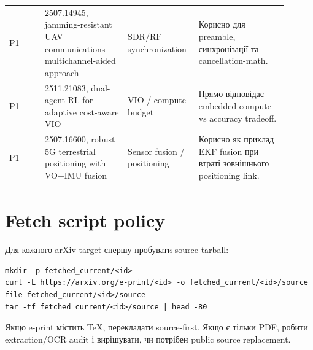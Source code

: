\begin{longtable}{L{0.12\linewidth}L{0.28\linewidth}L{0.20\linewidth}L{0.30\linewidth}}
P1 & 2507.14945, jamming-resistant UAV communications multichannel-aided approach & SDR/RF synchronization & Корисно для preamble, синхронізації та cancellation-math. \\
P1 & 2511.21083, dual-agent RL for adaptive cost-aware VIO & VIO / compute budget & Прямо відповідає embedded compute vs accuracy tradeoff. \\
P1 & 2507.16600, robust 5G terrestrial positioning with VO+IMU fusion & Sensor fusion / positioning & Корисно як приклад EKF fusion при втраті зовнішнього positioning link. \\
\bottomrule
\end{longtable}

\section*{Fetch script policy}

Для кожного arXiv target спершу пробувати source tarball:
\begin{lstlisting}
mkdir -p fetched_current/<id>
curl -L https://arxiv.org/e-print/<id> -o fetched_current/<id>/source
file fetched_current/<id>/source
tar -tf fetched_current/<id>/source | head -80
\end{lstlisting}
Якщо e-print містить TeX, перекладати source-first. Якщо є тільки PDF, робити extraction/OCR audit і вирішувати, чи потрібен public source replacement.
